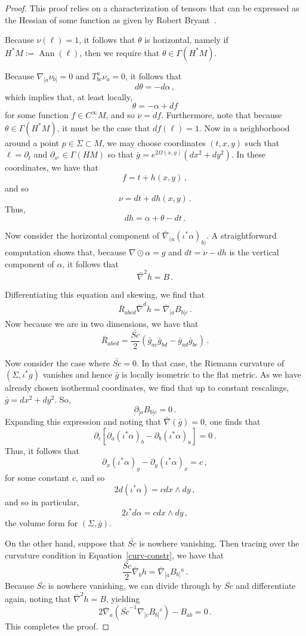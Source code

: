 \documentclass{article}
\theoremstyle{definition}
\theoremstyle{remark}
\begin{document}
\begin{proof}

    This proof relies on a characterization of tensors that can be expressed as the Hessian of some function as given by Robert Bryant~\cite{BryantSO}.
    

    Because $\nu(\ell) = 1$, it follows that $\theta$ is horizontal, namely if $H^*M := \operatorname{Ann}(\ell)$, then we require that  $\theta \in \Gamma(H^*M)$.


Because $\nabla_{[a} \nu_{b]} = 0$ and $T^a_{bc} \nu_a = 0$, it follows that
$$d \theta = - d \alpha\,,$$
which implies that, at least locally,
$$\theta = -\alpha + df$$
for some function $f \in C^\infty M$, and so $\nu = df$. Furthermore, note that because $\theta \in \Gamma(H^* M)$, it must be the case that $df(\ell) = 1$. Now in a neighborhood around a point $p \in \Sigma \subset M$, we may choose coordinates $(t,x,y)$ such that $\ell = \partial_t$ and $\partial_{x^i} \in \Gamma(HM)$ so that $\bar{g} = e^{2 \Omega(x,y)}(dx^2 + dy^2)$. In these coordinates, we have that
$$f = t + h(x,y)\,,$$
and so
$$\nu = dt + dh(x,y)\,.$$
Thus,
$$dh = \alpha + \theta - dt\,.$$

Now consider the horizontal component of $\bar{\nabla}_{(a}(\iota^* \alpha)_{b)}$. A straightforward computation shows that, because $ \nabla \odot\alpha = g$ and $dt = \nu - dh$ is the vertical component of $\alpha$, it follows that
$$\bar{\nabla}^2 h = B\,.$$

Differentiating this equation and skewing, we find that
\begin{align} \label{curv-constr}
    \bar{R}_{abcd} \bar{\nabla}^d h = \bar{\nabla}_{[a} B_{b]c}\,.
\end{align}
Now because we are in two dimensions, we have that
$$\bar{R}_{abcd} = \frac{\bar{Sc}}{2}(\bar{g}_{ac} \bar{g}_{bd} - \bar{g}_{ad} \bar{g}_{bc})\,.$$

Now consider the case where $\bar{Sc} = 0$. In that case, the Riemann curvature of $(\Sigma, \iota^* g)$ vanishes and hence $\bar{g}$ is locally isometric to the flat metric. As we have already chosen isothermal coordinates, we find that up to constant rescalings, $\bar{g} = dx^2 + dy^2$. So,
$$\partial_{[a} B_{b]c} = 0\,.$$
Expanding this expression and noting that $\bar{\nabla} (\bar{g}) = 0$, one finds that
$$\partial_c [\partial_a (\iota^*\alpha)_b - \partial_b (\iota^* \alpha)_a] = 0\,.$$
Thus, it follows that
$$\partial_x (\iota^* \alpha)_y - \partial_y (\iota^* \alpha)_x = c\,,$$
for some constant $c$, and so
$$2 d(\iota^* \alpha) = c dx \wedge dy\,,$$
and so in particular,
$$2 \iota^* d \alpha = c dx \wedge dy\,,$$
the volume form for $(\Sigma,\bar{g})$.

On the other hand, suppose that $\bar{Sc}$ is nowhere vanishing. Then tracing over the curvature condition in Equation~\ref{curv-constr}, we have that
$$\frac{\bar{Sc}}{2} \bar{\nabla}_b h= \bar{\nabla}_{[a} B_{b]}{}^a\,.$$
Because $\bar{Sc}$ is nowhere vanishing, we can divide through by $\bar{Sc}$ and differentiate again, noting that $\bar{\nabla}^2 h = B$, yielding
$$2 \bar{\nabla}_a (\bar{Sc}^{-1} \nabla_{[c} B_{b]}{}^c) - B_{ab} = 0\,.$$
This completes the proof.
    
\end{proof}
\end{document}
